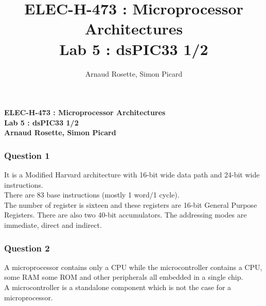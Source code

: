 \documentclass[a4paper,10pt]{article}
\title{ELEC-H-473 : Microprocessor Architectures\\ Lab 5 : dsPIC33 1/2}
\author{Arnaud Rosette, Simon Picard}
\begin{document}
\begin{center}
\textbf{ELEC-H-473 : Microprocessor Architectures\\ Lab 5 : dsPIC33 1/2\\Arnaud Rosette, Simon Picard}
\end{center}

\subsubsection*{Question 1}
It is a Modified Harvard architecture with 16-bit wide data path and 24-bit wide instructions.\\
There are 83 base instructions (mostly 1 word/1 cycle).\\
The number of register is sixteen and these registers are 16-bit General Purpose Registers. There are also two 40-bit accumulators. The addressing modes are immediate, direct and indirect.


\subsubsection*{Question 2}
A microprocessor contains only a CPU while the microcontroller contains a CPU, some RAM some ROM and other peripherals all embedded in a single chip.\\
A microcontroller is a standalone component which is not the case for a microprocessor.
\end{document}
